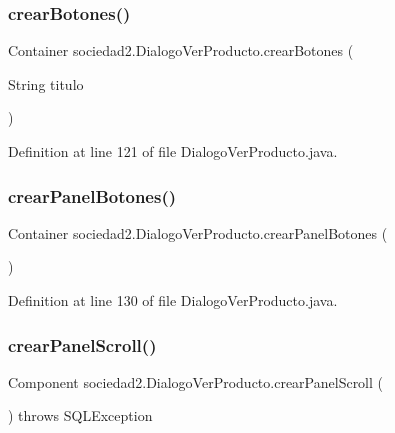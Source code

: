 \subsubsection{\texorpdfstring{crear\+Botones()}{crearBotones()}}
{\footnotesize\ttfamily Container sociedad2.\+Dialogo\+Ver\+Producto.\+crear\+Botones (\begin{DoxyParamCaption}\item[{String}]{titulo }\end{DoxyParamCaption})}



Definition at line 121 of file Dialogo\+Ver\+Producto.\+java.

\mbox{\label{classsociedad2_1_1_dialogo_ver_producto_a38490a666f21e0b4656d42d3e2e0d56f}} 
\subsubsection{\texorpdfstring{crear\+Panel\+Botones()}{crearPanelBotones()}}
{\footnotesize\ttfamily Container sociedad2.\+Dialogo\+Ver\+Producto.\+crear\+Panel\+Botones (\begin{DoxyParamCaption}{ }\end{DoxyParamCaption})}



Definition at line 130 of file Dialogo\+Ver\+Producto.\+java.

\mbox{\label{classsociedad2_1_1_dialogo_ver_producto_a14b7bf28144868d348c11cc781362b33}} 
\subsubsection{\texorpdfstring{crear\+Panel\+Scroll()}{crearPanelScroll()}}
{\footnotesize\ttfamily Component sociedad2.\+Dialogo\+Ver\+Producto.\+crear\+Panel\+Scroll (\begin{DoxyParamCaption}{ }\end{DoxyParamCaption}) throws S\+Q\+L\+Exception}



